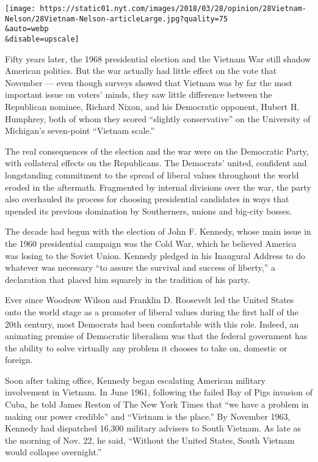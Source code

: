 \texttt{[image: https://static01.nyt.com/images/2018/03/28/opinion/28Vietnam-Nelson/28Vietnam-Nelson-articleLarge.jpg?quality=75\\\&auto=webp\\\&disable=upscale]}

Fifty years later, the 1968 presidential election and the Vietnam War
still shadow American politics. But the war actually had little effect
on the vote that November --- even though surveys showed that Vietnam
was by far the most important issue on voters' minds, they saw little
difference between the Republican nominee, Richard Nixon, and his
Democratic opponent, Hubert H. Humphrey, both of whom they scored
``slightly conservative'' on the University of Michigan's seven-point
``Vietnam scale.''

The real consequences of the election and the war were on the Democratic
Party, with collateral effects on the Republicans. The Democrats'
united, confident and longstanding commitment to the spread of liberal
values throughout the world eroded in the aftermath. Fragmented by
internal divisions over the war, the party also overhauled its process
for choosing presidential candidates in ways that upended its previous
domination by Southerners, unions and big-city bosses.

The decade had begun with the election of John F. Kennedy, whose main
issue in the 1960 presidential campaign was the Cold War, which he
believed America was losing to the Soviet Union. Kennedy pledged in his
Inaugural Address to do whatever was necessary ``to assure the survival
and success of liberty,'' a declaration that placed him squarely in the
tradition of his party.

Ever since Woodrow Wilson and Franklin D. Roosevelt led the United
States onto the world stage as a promoter of liberal values during the
first half of the 20th century, most Democrats had been comfortable with
this role. Indeed, an animating premise of Democratic liberalism was
that the federal government has the ability to solve virtually any
problem it chooses to take on, domestic or foreign.

Soon after taking office, Kennedy began escalating American military
involvement in Vietnam. In June 1961, following the failed Bay of Pigs
invasion of Cuba, he told James Reston of The New York Times that ``we
have a problem in making our power credible'' and ``Vietnam is the
place.'' By November 1963, Kennedy had dispatched 16,300 military
advisers to South Vietnam. As late as the morning of Nov. 22, he said,
``Without the United States, South Vietnam would collapse overnight.''


